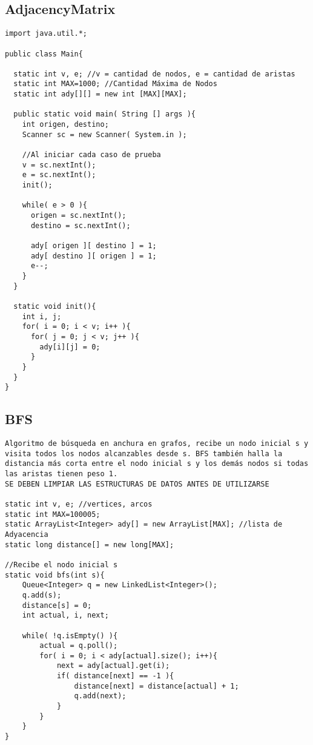 \documentclass[10pt,letterpaper,twocolumn,twosided]{article}
\begin{document}
\subsection{AdjacencyMatrix}
\begin{lstlisting}
import java.util.*;

public class Main{
  
  static int v, e; //v = cantidad de nodos, e = cantidad de aristas
  static int MAX=1000; //Cantidad Máxima de Nodos
  static int ady[][] = new int [MAX][MAX];
  
  public static void main( String [] args ){
    int origen, destino;
    Scanner sc = new Scanner( System.in );
    
    //Al iniciar cada caso de prueba
    v = sc.nextInt();
    e = sc.nextInt();
    init();
    
    while( e > 0 ){
      origen = sc.nextInt();
      destino = sc.nextInt();
      
      ady[ origen ][ destino ] = 1;
      ady[ destino ][ origen ] = 1;
      e--;
    }
  }
  
  static void init(){
    int i, j;
    for( i = 0; i < v; i++ ){
      for( j = 0; j < v; j++ ){
        ady[i][j] = 0;
      }
    }
  }
}
\end{lstlisting}

\subsection{BFS}
\begin{lstlisting}
Algoritmo de búsqueda en anchura en grafos, recibe un nodo inicial s y visita todos los nodos alcanzables desde s. BFS también halla la distancia más corta entre el nodo inicial s y los demás nodos si todas las aristas tienen peso 1.
SE DEBEN LIMPIAR LAS ESTRUCTURAS DE DATOS ANTES DE UTILIZARSE

static int v, e; //vertices, arcos
static int MAX=100005; 
static ArrayList<Integer> ady[] = new ArrayList[MAX]; //lista de Adyacencia
static long distance[] = new long[MAX];

//Recibe el nodo inicial s
static void bfs(int s){
    Queue<Integer> q = new LinkedList<Integer>();
    q.add(s); 
    distance[s] = 0;
    int actual, i, next;
        
    while( !q.isEmpty() ){
        actual = q.poll();
        for( i = 0; i < ady[actual].size(); i++){
            next = ady[actual].get(i);
            if( distance[next] == -1 ){
                distance[next] = distance[actual] + 1;
                q.add(next);
            }
        }
    }
}\end{lstlisting}
\end{document}
